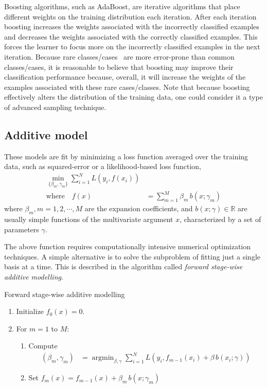 \documentclass{book}
\DeclareMathOperator*{\argmin}{argmin}
\begin{document}
Boosting algorithms, such as AdaBoost, are iterative algorithms that place different weights on the training distribution each iteration. After each iteration boosting increases the weights associated with the incorrectly classified examples and decreases the weights associated with the correctly classified examples. This forces the learner to focus more on the incorrectly classified examples in the next iteration. Because rare classes/cases~\cite{DBLP:journals/sigkdd/Weiss04} are more error-prone than common classes/cases, it is reasonable to believe that boosting may improve their classification performance because, overall, it will increase the weights of the examples associated with these rare cases/classes. Note that because boosting effectively alters the distribution of the training data, one could consider it a type of advanced sampling technique.

\subsection{Additive model}
These models are fit by minimizing a loss function averaged over the training data, such as squared-error or a likelihood-based loss function,
\begin{align*}
\min_{\{\beta_m,\gamma_m\}} \sum_{i=1}^{N} L(y_i, f(x_i)) & \\
\mbox{where} \quad f(x) &= \sum_{m=1}^{M} \beta_m \, b(x;\gamma_m)
\end{align*}
where $\beta_m, m=1,2,\cdots,M$ are the expansion coefficients, and $b(x;\gamma) \in \mathbb{R}$ are usually simple functions of the multivariate argument $x$, characterized  by a set of parameters $\gamma$.  

The above function requires computationally intensive numerical optimization techniques. A simple alternative is to solve the subproblem of fitting just a single basis at a time. This is described in the algorithm called  \emph{forward stage-wise additive modelling}.
\begin{algorithm}[h]
\caption{Forward stage-wise additive modelling}
\begin{enumerate}
\item Initialize $f_0(x) = 0$.
\item For $m = 1$ to $M$:
	\begin{enumerate}
	\item Compute
		\begin{align*}
		(\beta_m,\gamma_m) &= \argmin_{\beta,\gamma} \sum_{i=1}^{N} L(y_i, f_{m-1}(x_i) + \beta \, b(x_i;\gamma))
		\end{align*}
	\item Set $f_m(x) = f_{m-1}(x) + \beta_m \, b(x;\gamma_m)$
	\end{enumerate}
\end{enumerate}
\end{algorithm}
\end{document}
